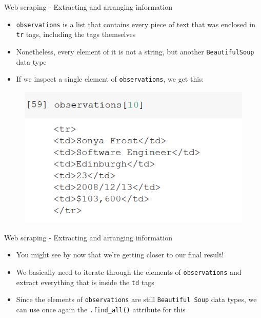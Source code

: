 \documentclass[aspectratio=169]{beamer}
\begin{document}
\begin{frame}{Web scraping - Extracting and arranging information}

	\begin{itemize}
		\item \texttt{observations} is a list that contains every piece of text that was enclosed in \texttt{tr} tags, including the tags themselves
		\item Nonetheless, every element of it is not a string, but another \texttt{BeautifulSoup} data type
		\item If we inspect a single element of \texttt{observations}, we get this:
	\end{itemize}

	\begin{figure}
		\centering
		\includegraphics[width=0.5\linewidth]{img/tr_list_element.png}
	\end{figure}

\end{frame}

\begin{frame}{Web scraping - Extracting and arranging information}

	\begin{itemize}
		\item You might see by now that we're getting closer to our final result!
		\item We basically need to iterate through the elements of \texttt{observations} and extract everything that is inside the \texttt{td} tags
		\item Since the elements of \texttt{observations} are still \texttt{Beautiful Soup} data types, we can use once again the \texttt{.find\_all()} attribute for this 
	\end{itemize}

\end{frame}
\end{document}
